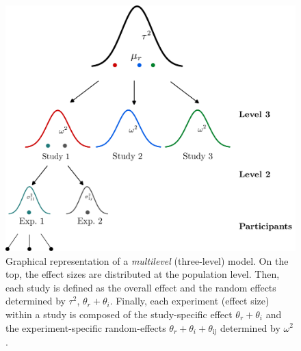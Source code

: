 \documentclass[
  man,floatsintext]{apa6}
\begin{document}
\scriptsize

\begin{figure}[H]

{\centering \includegraphics[width=0.8\linewidth]{img/multilevel} 

}

\caption{Graphical representation of a \emph{multilevel} (three-level) model. On the top, the effect sizes are distributed at the population level. Then, each study is defined as the overall effect and the random effects determined by \(\tau^{2}\), \(\theta_{r} + \theta_{i}\). Finally, each experiment (effect size) within a study is composed of the study-specific effect \(\theta_{r} + \theta_{i}\) and the experiment-specific random-effects \(\theta_{r} + \theta_{i} + \theta_{\text{ij}}\) determined by \(\omega^{2}\).}\label{fig:img-multilevel}
\end{figure}

\normalsize

\scriptsize
\end{document}
